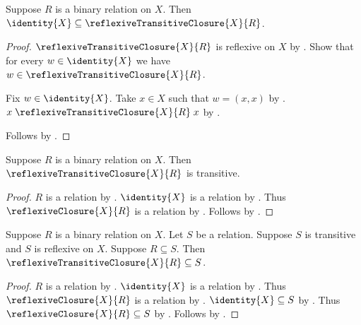 \begin{proposition}\label{identity_subseteq_reflexive_transitive_closure}
    Suppose $R$ is a binary relation on $X$.
    Then $\identity{X}\subseteq
        \reflexiveTransitiveClosure{X}{R}$.
\end{proposition}
\begin{proof}
    $\reflexiveTransitiveClosure{X}{R}$ is reflexive on $X$
        by .
    Show that for every $w\in\identity{X}$ we have
        $w\in\reflexiveTransitiveClosure{X}{R}$.
    \begin{subproof}
        Fix $w\in\identity{X}$.
        Take $x\in X$ such that $w=(x,x)$ by .
        $x\mathrel{\reflexiveTransitiveClosure{X}{R}}x$
            by .
    \end{subproof}
    Follows by .
\end{proof}

\begin{proposition}\label{reflexive_transitive_closure_is_transitive}
    Suppose $R$ is a binary relation on $X$.
    Then $\reflexiveTransitiveClosure{X}{R}$ is transitive.
\end{proposition}
\begin{proof}
    $R$ is a relation by .
    $\identity{X}$ is a relation by .
    Thus $\reflexiveClosure{X}{R}$ is a relation
        by .
    Follows by .
\end{proof}

\begin{proposition}\label{reflexive_transitive_closure_least}
    Suppose $R$ is a binary relation on $X$.
    Let $S$ be a relation.
    Suppose $S$ is transitive and $S$ is reflexive on $X$.
    Suppose $R\subseteq S$.
    Then $\reflexiveTransitiveClosure{X}{R}\subseteq S$.
\end{proposition}
\begin{proof}
    $R$ is a relation by .
    $\identity{X}$ is a relation by .
    Thus $\reflexiveClosure{X}{R}$ is a relation
        by .
    $\identity{X}\subseteq S$
        by .
    Thus $\reflexiveClosure{X}{R}\subseteq S$
        by .
    Follows by .
\end{proof}

